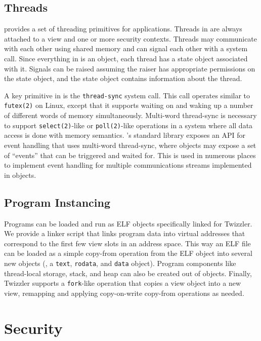 \subsection{Threads}

\Twizzler provides a set of threading primitives for applications. Threads in \Twizzler are always
attached to a view and one or more security contexts. Threads may communicate with each other using
shared memory and can signal each other with a system call.
Since everything in \Twizzler is an object, each thread has a state object associated
with it. Signals can be raised assuming the raiser has appropriate permissions on the state object,
and the state object contains information about the thread.

A key primitive in \Twizzler is the \texttt{thread-sync} system call. This call operates similar to
\texttt{futex(2)} on Linux, except that it supports waiting on and waking up a number of different
words of memory simultaneously. Multi-word thread-sync is necessary to support
\texttt{select(2)}-like or \texttt{poll(2)}-like operations in a system where all data access is
done with memory semantics. \Twizzler's standard library exposes an API for event handling that uses
multi-word thread-sync, where objects may expose a set of ``events'' that can be triggered and waited for. This is
used in numerous places to implement event handling for multiple communications streams implemented
in objects.

\subsection{Program Instancing}

Programs can be loaded and run as ELF objects specifically linked for Twizzler. We provide a linker script that links
program data into virtual addresses that correspond to the first few view slots in an address space. This way an ELF
file can be loaded as a simple copy-from operation from the ELF object into several new objects (\eg, a \texttt{text},
\texttt{rodata}, and \texttt{data} object). Program components like thread-local storage, stack, and heap can also be
created out of objects. Finally, Twizzler supports a \texttt{fork}-like operation that copies a view object into a new
view, remapping and applying copy-on-write copy-from operations as needed.

\section{Security}
\label{sec:sec}


